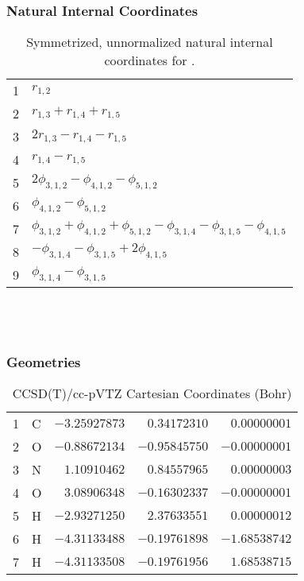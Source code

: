 \documentclass[10pt,oneside]{article}
\begin{document}
\subsubsection*{Natural Internal Coordinates}
\begin{table}[h!]
\centering
\caption{Symmetrized, unnormalized natural internal coordinates for .}
\small
\begin{tabular}{ll}
  1   & $r_{1,2}$ \\
  2   & $r_{1,3} + r_{1,4} + r_{1,5}$ \\
  3   & $2r_{1,3} - r_{1,4} - r_{1,5}$ \\
  4   & $r_{1,4} - r_{1,5}$ \\
  5   & $2\phi_{3,1,2} - \phi_{4,1,2} - \phi_{5,1,2}$ \\
  6   & $\phi_{4,1,2} - \phi_{5,1,2}$ \\
  7   & $\phi_{3,1,2} + \phi_{4,1,2} + \phi_{5,1,2} - \phi_{3,1,4} - \phi_{3,1,5} - \phi_{4,1,5}$ \\
  8   & $-\phi_{3,1,4} - \phi_{3,1,5} + 2\phi_{4,1,5}$ \\
  9   & $\phi_{3,1,4} - \phi_{3,1,5}$ \\
\end{tabular}
\end{table}

\clearpage

\subsection{\ \ \ }

\subsubsection*{Geometries}
\begin{table}[h!]
\centering
\caption{CCSD(T)/cc-pVTZ Cartesian Coordinates (Bohr)}
\begin{tabular}{llrrr}
1  & C  & $-3.25927873$ & $ 0.34172310$ & $ 0.00000001$ \\
2  & O  & $-0.88672134$ & $-0.95845750$ & $-0.00000001$ \\
3  & N  & $ 1.10910462$ & $ 0.84557965$ & $ 0.00000003$ \\
4  & O  & $ 3.08906348$ & $-0.16302337$ & $-0.00000001$ \\
5  & H  & $-2.93271250$ & $ 2.37633551$ & $ 0.00000012$ \\
6  & H  & $-4.31133488$ & $-0.19761898$ & $-1.68538742$ \\
7  & H  & $-4.31133508$ & $-0.19761956$ & $ 1.68538715$ \\
\end{tabular}
\end{table}
\end{document}
